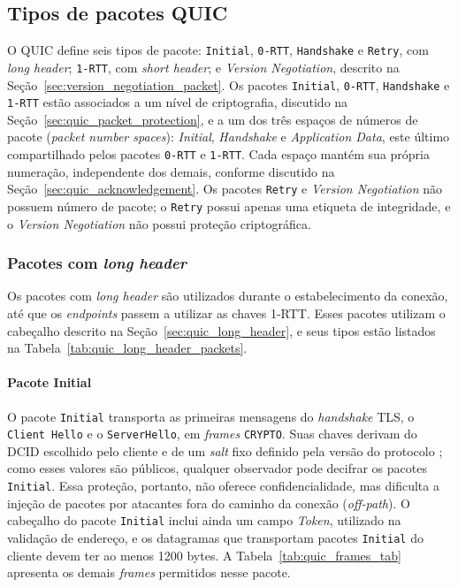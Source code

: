 \subsection{Tipos de pacotes QUIC}

O QUIC define seis tipos de pacote: \texttt{Initial}, \texttt{0-RTT}, \texttt{Handshake} e \texttt{Retry}, com \textit{long header}; \texttt{1-RTT}, com \textit{short header}; e \textit{Version Negotiation}, descrito na Seção~\ref{sec:version_negotiation_packet}. Os pacotes \texttt{Initial}, \texttt{0-RTT}, \texttt{Handshake} e \texttt{1-RTT} estão associados a um nível de criptografia, discutido na Seção~\ref{sec:quic_packet_protection}, e a um dos três espaços de números de pacote (\textit{packet number spaces}): \textit{Initial}, \textit{Handshake} e \textit{Application Data}, este último compartilhado pelos pacotes \texttt{0-RTT} e \texttt{1-RTT}. Cada espaço mantém sua própria numeração, independente dos demais, conforme discutido na Seção~\ref{sec:quic_acknowledgement}. Os pacotes \texttt{Retry} e \textit{Version Negotiation} não possuem número de pacote; o \texttt{Retry} possui apenas uma etiqueta de integridade, e o \textit{Version Negotiation} não possui proteção criptográfica.

\subsubsection{Pacotes com \textit{long header}}
\label{sec:quic_long_header_packets}

Os pacotes com \textit{long header} são utilizados durante o estabelecimento da conexão, até que os \textit{endpoints} passem a utilizar as chaves 1-RTT. Esses pacotes utilizam o cabeçalho descrito na Seção~\ref{sec:quic_long_header}, e seus tipos estão listados na Tabela~\ref{tab:quic_long_header_packets}.


\paragraph{Pacote Initial}

O pacote \texttt{Initial} transporta as primeiras mensagens do \textit{handshake} TLS, o \texttt{Client Hello} e o \texttt{ServerHello}, em \textit{frames} \texttt{CRYPTO}. Suas chaves derivam do DCID escolhido pelo cliente e de um \textit{salt} fixo definido pela versão do protocolo \citep{rfc9001}; como esses valores são públicos, qualquer observador pode decifrar os pacotes \texttt{Initial}. Essa proteção, portanto, não oferece confidencialidade, mas dificulta a injeção de pacotes por atacantes fora do caminho da conexão (\textit{off-path}). O cabeçalho do pacote \texttt{Initial} inclui ainda um campo \textit{Token}, utilizado na validação de endereço, e os datagramas que transportam pacotes \texttt{Initial} do cliente devem ter ao menos 1200 bytes. A Tabela~\ref{tab:quic_frames_tab} apresenta os demais \textit{frames} permitidos nesse pacote.

